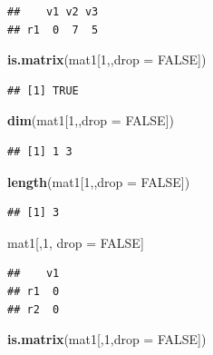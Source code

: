 \documentclass[]{book}
\newenvironment{Shaded}{\begin{snugshade}}{\end{snugshade}}
\newcommand{\KeywordTok}[1]{\textcolor[rgb]{0.13,0.29,0.53}{\textbf{{#1}}}}
\newcommand{\DataTypeTok}[1]{\textcolor[rgb]{0.13,0.29,0.53}{{#1}}}
\newcommand{\DecValTok}[1]{\textcolor[rgb]{0.00,0.00,0.81}{{#1}}}
\newcommand{\StringTok}[1]{\textcolor[rgb]{0.31,0.60,0.02}{{#1}}}
\newcommand{\OtherTok}[1]{\textcolor[rgb]{0.56,0.35,0.01}{{#1}}}
\newcommand{\NormalTok}[1]{{#1}}
\theoremstyle{definition}
\theoremstyle{definition}
\theoremstyle{remark}
\begin{document}
\begin{verbatim}
##    v1 v2 v3
## r1  0  7  5
\end{verbatim}

\begin{Shaded}
\begin{Highlighting}[]
\KeywordTok{is.matrix}\NormalTok{(mat1[}\DecValTok{1}\NormalTok{,,}\DataTypeTok{drop =} \OtherTok{FALSE}\NormalTok{])  }
\end{Highlighting}
\end{Shaded}

\begin{verbatim}
## [1] TRUE
\end{verbatim}

\begin{Shaded}
\begin{Highlighting}[]
\KeywordTok{dim}\NormalTok{(mat1[}\DecValTok{1}\NormalTok{,,}\DataTypeTok{drop =} \OtherTok{FALSE}\NormalTok{])}
\end{Highlighting}
\end{Shaded}

\begin{verbatim}
## [1] 1 3
\end{verbatim}

\begin{Shaded}
\begin{Highlighting}[]
\KeywordTok{length}\NormalTok{(mat1[}\DecValTok{1}\NormalTok{,,}\DataTypeTok{drop =} \OtherTok{FALSE}\NormalTok{])  }
\end{Highlighting}
\end{Shaded}

\begin{verbatim}
## [1] 3
\end{verbatim}

\begin{Shaded}
\begin{Highlighting}[]
\NormalTok{mat1[,}\DecValTok{1}\NormalTok{, drop =}\StringTok{ }\OtherTok{FALSE}\NormalTok{]}
\end{Highlighting}
\end{Shaded}

\begin{verbatim}
##    v1
## r1  0
## r2  0
\end{verbatim}

\begin{Shaded}
\begin{Highlighting}[]
\KeywordTok{is.matrix}\NormalTok{(mat1[,}\DecValTok{1}\NormalTok{,}\DataTypeTok{drop =} \OtherTok{FALSE}\NormalTok{])  }
\end{Highlighting}
\end{Shaded}
\end{document}
